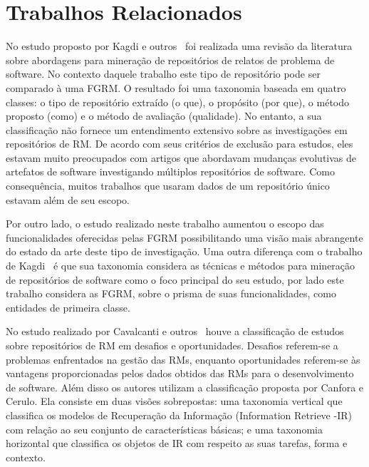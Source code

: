 

\section{Trabalhos Relacionados}
\label{sec:map_trabalhos_relacionados}

No estudo proposto por Kagdi e outros~\cite{kagdi2012assigning} foi realizada
uma revisão da literatura sobre abordagens para mi\-ne\-ra\-ção de repositórios de
relatos de problema de software. No contexto daquele trabalho este tipo de
repositório pode ser comparado à uma FGRM\@. O resultado foi uma taxonomia
baseada em quatro classes: o tipo de repositório extraído (o que), o propósito
(por que), o método proposto (como) e o método de avaliação (qualidade). No
entanto, a sua classificação não fornece um entendimento extensivo sobre as
investigações em repositórios de RM\@. De acordo com seus critérios de exclusão
para estudos, eles estavam muito preocupados com artigos que abordavam mudanças
evolutivas de artefatos de software investigando múltiplos repositórios de
software. Como consequência, muitos trabalhos que usaram dados de um repositório
único estavam além de seu escopo.

Por outro lado, o estudo realizado neste trabalho aumentou o escopo das
funcionalidades oferecidas pelas FGRM possibilitando uma visão mais abrangente
do estado da arte deste tipo de investigação. Uma outra diferença com o trabalho
de Kagdi~\cite{kagdi2012assigning} é que sua taxonomia considera as técnicas e
métodos para mineração de repositórios de software como o foco principal do seu
estudo, por lado este trabalho considera as FGRM, sobre o prisma de suas
funcionalidades, como entidades de primeira classe.

No estudo realizado por Cavalcanti e outros~\cite{cavalcanti2014challenges}
houve a classificação de estudos sobre repositórios de RM em desafios e
oportunidades. Desafios referem-se a problemas enfrentados na gestão das RMs,
enquanto oportunidades referem-se às vantagens proporcionadas pelos dados
obtidos das  RMs para o desenvolvimento de software. Além disso os autores
utilizam a classificação proposta por Canfora e Cerulo\cite{cerulo2004taxonomy}.
Ela consiste em duas visões sobrepostas: uma taxonomia vertical que classifica
os modelos de Recuperação da Informação (Information Retrieve \@-\@ IR) com
relação ao seu conjunto de características básicas; e uma taxonomia horizontal
que classifica os objetos de IR com respeito as suas tarefas, forma e contexto.

